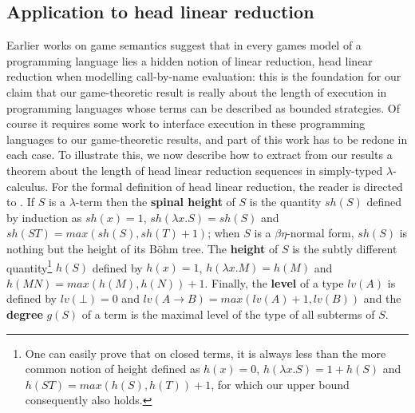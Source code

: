 \documentclass{article}
\begin{document}
\subsection{Application to head linear reduction}

Earlier works on game semantics \cite{danosregnier} suggest that in every games model of a programming language lies a hidden notion of linear reduction, head linear reduction
when modelling call-by-name evaluation: this is the foundation for our claim that our game-theoretic result is really about the length of execution in programming languages whose terms can
be described as bounded strategies. Of course it requires some work to interface execution in these programming languages to our game-theoretic results, and part of this work has to be redone in each case. 
To illustrate this, we now describe how to extract from our results a theorem about the length of head linear reduction sequences in simply-typed $\lambda$-calculus. For the formal definition of head linear reduction, the reader
is directed to \cite{danos:abstract}. If $S$ is a $\lambda$-term then the \textbf{spinal height} of $S$ is the quantity $sh(S)$ defined by induction as $sh(x) = 1$, $sh(\lambda x.S) = sh(S)$ and $sh(S T) = max(sh(S), sh(T)+1)$; when $S$ is a $\beta\eta$-normal form, $sh(S)$ is nothing but the height of its Böhm tree.
The \textbf{height} of $S$ is the subtly different quantity\footnote{One can easily prove that on closed terms, it is always less than the more common notion of height defined as
$h(x) = 0$, $h(\lambda x. S) = 1 + h(S)$ and $h(S T) = max(h(S), h(T))+1$, for which our upper bound consequently also holds.} $h(S)$ defined by $h(x) = 1$, $h(\lambda x. M) = h(M)$ and $h(M N) = max(h(M), h(N)) + 1$. Finally, the
\textbf{level} of a type $lv(A)$ is defined by $lv(\bot) = 0$ and $lv(A\to B) = max(lv(A) + 1, lv(B))$ and the \textbf{degree} $g(S)$ of a term is the maximal level of the type of all subterms
of $S$.
\end{document}
